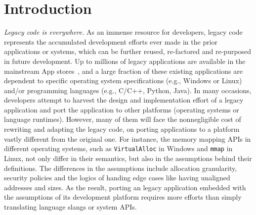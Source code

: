 \chapter{Introduction}
\label{chap:intro}


\emph{Legacy code is everywhere.}
As an immense resource for developers,
legacy code represents the accumulated development efforts ever made in the prior applications or systems,
which can be further reused, re-factored and re-purposed in future development.
Up to millions of legacy applications
are available
in the mainstream App stores~\citep{google-play, apple-store, ubuntu-packages},
and a large fraction of these existing applications
are dependent to specific operating system specifications (e.g., Windows or Linux)
and/or programming languages (e.g., C/C++, Python, Java).
In many occasions,
developers attempt to harvest the design and implementation effort of a legacy application
and port the application to other platforms
(operating systems or language runtimes).
However, many of them will face the nonnegligible cost of
rewriting and adapting the legacy code,
on porting applications to a platform vastly different from the original one.
For instance, the memory mapping APIs in different operating systems,
such as {\tt VirtualAlloc} in Windows and {\tt mmap} in Linux,
not only differ in their semantics, but also in the assumptions behind their definitions.
The differences in the assumptions
include allocation granularity, security policies
and the logics of handing edge cases like having unaligned addresses and sizes.
As the result, porting an legacy application embedded with the assumptions of its development platform
requires more efforts than simply translating language slangs or system APIs.





